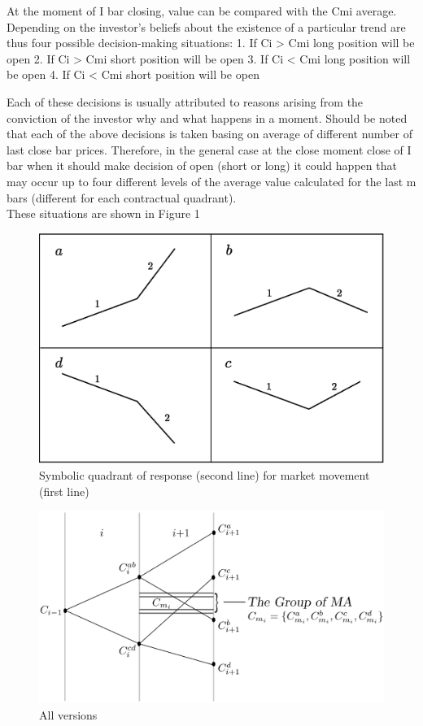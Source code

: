 \documentclass{tewiart}
\begin{document}
At the moment of I bar closing, value can be compared with the Cmi average. Depending on the investor's beliefs about the existence of a particular trend are thus four possible decision-making situations:
1. If Ci  > Cmi  long position will be open
2. If Ci  > Cmi  short position will be open
3. If Ci  < Cmi  long position will be open
4. If Ci  < Cmi  short position will be open

Each of these decisions is usually attributed to reasons arising from the conviction of the investor why and what happens in a moment. Should be noted that each of the above decisions is taken basing on average of different number of last close bar prices. Therefore, in the general case at the close moment close of I bar when it should make decision of open (short or long) it could happen that may occur up to four different levels of the average value calculated for the last m bars (different for each contractual quadrant).\\
These situations are shown in Figure 1

\begin{figure}[h]
 \centering
 \includegraphics[width=\textwidth]{Rysunek0_all2.eps}
 \caption{Symbolic quadrant of response (second line) for market movement (first line)}
\end{figure}
\FloatBarrier

\begin{figure}[h]
\centering
\centering 
\includegraphics[width=\textwidth]{rysunek1pp.eps}
\caption{All versions}
\end{figure}
\FloatBarrier
\end{document}
